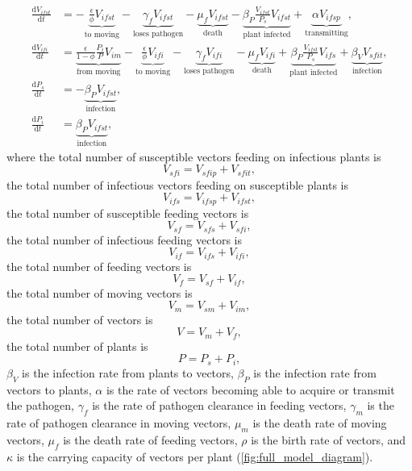 \documentclass{article}
\newcommand{\md}{\mathrm{d}}
\begin{document}
\begin{equation}
\begin{split}
    \frac{\md V_{ifst}}{\md t}
    &=
    - \underbrace{\frac{\epsilon}{\phi} V_{ifst}}_{\text{to moving}}
    - \underbrace{\gamma_f V_{ifst}}_{\text{loses pathogen}}
    - \underbrace{\mu_f V_{ifst}}_{\text{death}}
    - \underbrace{\beta_P \frac{V_{ifst}}{P_s} V_{ifst}}_{\text{plant infected}}
    + \underbrace{\alpha V_{ifsp}}_{\text{transmitting}},
    \\
    \frac{\md V_{ifi}}{\md t}
    &=
    \underbrace{\frac{\epsilon}{1 - \phi} \frac{P_i}{P} V_{im}}_{\text{from moving}}
    - \underbrace{\frac{\epsilon}{\phi} V_{ifi}}_{\text{to moving}}
    - \underbrace{\gamma_f V_{ifi}}_{\text{loses pathogen}}
    - \underbrace{\mu_f V_{ifi}}_{\text{death}}
    + \underbrace{\beta_P \frac{V_{ifst}}{P_s} V_{ifs}}_{\text{plant infected}}
    + \underbrace{\beta_V V_{sfit}}_{\text{infection}},
    \\
    \frac{\md P_s}{\md t}
    &=
    - \underbrace{\beta_P V_{ifst}}_{\text{infection}},
    \\
    \frac{\md P_i}{\md t}
    &=
    \underbrace{\beta_P V_{ifst}}_{\text{infection}},
  \end{split}
\end{equation}
where the total number of susceptible vectors feeding on infectious
plants is
\begin{equation}
  V_{sfi} = V_{sfip} + V_{sfit},
\end{equation}
the total number of infectious vectors feeding on susceptible plants
is
\begin{equation}
  V_{ifs} = V_{ifsp} + V_{ifst},
\end{equation}
the total number of susceptible feeding vectors is
\begin{equation}
  V_{sf} = V_{sfs} + V_{sfi},
\end{equation}
the total number of infectious feeding vectors is
\begin{equation}
  V_{if} = V_{ifs} + V_{ifi},
\end{equation}
the total number of feeding vectors is
\begin{equation}
  V_f = V_{sf} + V_{if},
\end{equation}
the total number of moving vectors is
\begin{equation}
  V_m = V_{sm} + V_{im},
\end{equation}
the total number of vectors is
\begin{equation}
  V = V_m + V_f,
\end{equation}
the total number of plants is
\begin{equation}
  P = P_s + P_i,
\end{equation}
$\beta_V$ is the infection rate from plants to vectors, $\beta_P$ is
the infection rate from vectors to plants, $\alpha$ is the rate of
vectors becoming able to acquire or transmit the pathogen,
$\gamma_f$ is the rate of pathogen clearance in feeding vectors,
$\gamma_m$ is the rate of pathogen clearance in moving vectors,
$\mu_m$ is the death rate of moving vectors, $\mu_f$ is the
death rate of feeding vectors, $\rho$ is the birth rate of vectors,
and $\kappa$ is the carrying capacity of vectors per plant
(\autoref{fig:full_model_diagram}).
\end{document}
